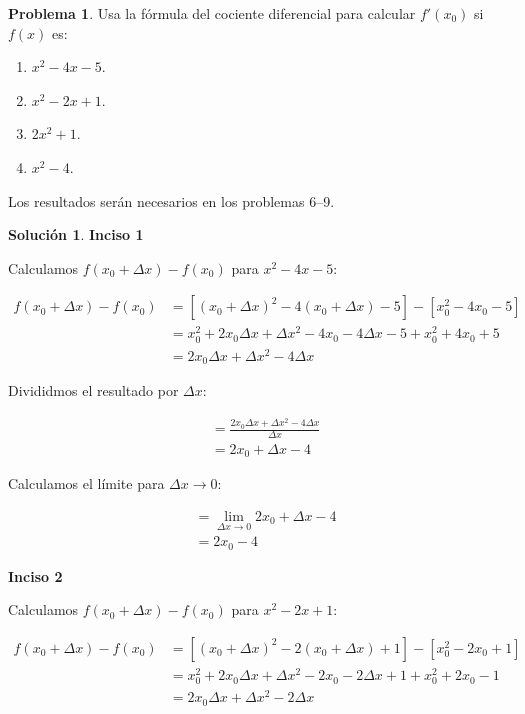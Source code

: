 \documentclass{article}
\theoremstyle{definition}
\newtheorem{problem}{Problema}
\newtheorem*{solution}{Solución}
\begin{document}
\bigskip

\begin{problem}
Usa la fórmula del cociente diferencial para calcular \( f'(x_0) \) si \( f(x) \) es:
\begin{enumerate}
    \item \( x^2 - 4x - 5 \).
    \item \( x^2 - 2x + 1 \).
    \item \( 2x^2 + 1 \).
    \item \( x^2 - 4 \).
\end{enumerate}
Los resultados serán necesarios en los problemas 6--9.
\end{problem}

\begin{solution}
\textbf{Inciso 1}

Calculamos \( f(x_0+\Delta x)-f(x_0)\) para \( x^2 - 4x - 5 \):

    \begin{align*}
    f(x_0+\Delta x)-f(x_0) &= [(x_0+\Delta x)^2-4(x_0+\Delta x)-5]-[x_0^2-4x_0-5] \\
    &= x_0^2 + 2x_0\Delta x + \Delta x^2 - 4x_0 - 4\Delta x - 5 + x_0^2 + 4x_0 + 5 \\
    &= 2x_0\Delta x + \Delta x^2 - 4 \Delta x
    \end{align*}

Divididmos el resultado por \( \Delta x \):

    \begin{align*}
    &= \frac{2x_0\Delta x + \Delta x^2 - 4 \Delta x}{\Delta x} \\
    &= 2x_0 + \Delta x - 4
    \end{align*}

Calculamos el límite para \( \Delta x \to 0 \):

    \begin{align*}
        &= \lim_{\Delta x \to 0} 2x_0 + \Delta x - 4 \\
        &= 2x_0 - 4
    \end{align*}

\textbf{Inciso 2}

Calculamos \( f(x_0+\Delta x)-f(x_0)\) para \( x^2 - 2x + 1 \):

    \begin{align*}
    f(x_0+\Delta x)-f(x_0) &= [(x_0+\Delta x)^2-2(x_0+\Delta x)+1]-[x_0^2-2x_0+1] \\
    &= x_0^2 + 2x_0\Delta x + \Delta x^2 - 2x_0 - 2\Delta x + 1 + x_0^2 + 2x_0 - 1 \\
    &= 2x_0\Delta x + \Delta x^2 - 2 \Delta x
    \end{align*}


\end{solution}
\end{document}
